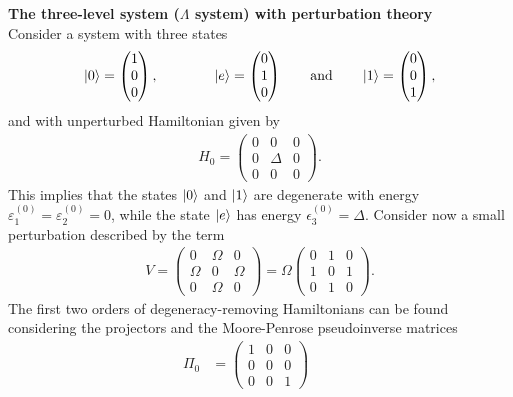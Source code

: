 \begin{tcolorbox}
\textbf{The three-level system ($\Lambda$ system) with perturbation theory} \\
Consider a system with three states
\begin{align*}
    \ket{0} = \begin{pmatrix} 1 \\ 0 \\ 0 \end{pmatrix}, \qquad \qquad \ket{e} = \begin{pmatrix} 0 \\ 1 \\ 0 \end{pmatrix} \qquad \text{and} \qquad \ket{1} = \begin{pmatrix} 0 \\ 0 \\ 1 \end{pmatrix},
\end{align*}
and with unperturbed Hamiltonian given by 
\begin{align*}
    H_0 = \begin{pmatrix} 0 & 0 & 0 \\ 0 & \Delta & 0 \\ 0 & 0 & 0 \end{pmatrix}.
\end{align*}
This implies that the states $\ket{0}$ and $\ket{1}$ are degenerate with energy $\varepsilon_1^{(0)} = \varepsilon_2^{(0)} = 0$, while the state $\ket{e}$ has energy $\epsilon_3^{(0)} = \Delta$. Consider now a small perturbation described by the term
\begin{align*}
    V = \begin{pmatrix} 0 & \Omega & 0 \\ \Omega & 0 & \Omega \\ 0 & \Omega & 0 \end{pmatrix} = \Omega \begin{pmatrix} 0 & 1 & 0 \\ 1 & 0 & 1 \\ 0 & 1 & 0 \end{pmatrix}. 
\end{align*}
The first two orders of degeneracy-removing Hamiltonians can be found considering the projectors and the Moore-Penrose pseudoinverse matrices
\begin{align*}
    \Pi_0 &= \begin{pmatrix} 1 & 0 & 0 \\ 0 & 0 & 0 \\ 0 & 0 & 1 \end{pmatrix} \qquad

\end{align*}
\end{tcolorbox}
